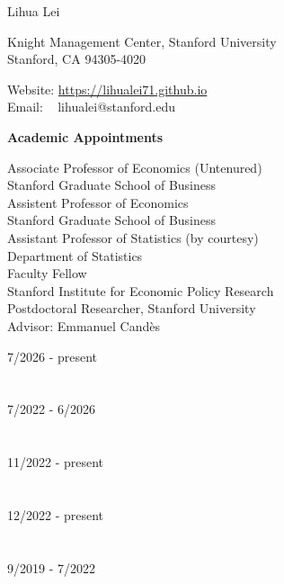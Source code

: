 \documentclass{article}
\begin{document}
\begin{Huge}
\noindent Lihua Lei
\end{Huge}

\vspace{5mm}
\begin{minipage}{0.6\linewidth}
  \flushleft
\noindent Knight Management Center, Stanford University \\
\noindent Stanford, CA 94305-4020
\end{minipage}
\hfill
\begin{minipage}{0.4\linewidth}
  Website: \url{https://lihualei71.github.io}\\
  Email: \,\,\,\,\,lihualei@stanford.edu
\end{minipage}

\vspace{5mm}
\begin{large}
\noindent \textbf{Academic Appointments}
\end{large}
\vspace{5mm}

\begin{minipage}{0.65\linewidth}
  \noindent Associate Professor of Economics (Untenured)\\
  Stanford Graduate School of Business\\

  \noindent Assistent Professor of Economics\\
  Stanford Graduate School of Business\\
  
  \noindent Assistant Professor of Statistics (by courtesy) \\
  Department of Statistics\\

  \noindent Faculty Fellow \\
  Stanford Institute for Economic Policy Research \\

  \noindent Postdoctoral Researcher, Stanford University\\
  Advisor: Emmanuel Cand\`{e}s
\end{minipage}\hfill
\begin{minipage}{0.34\linewidth}
\flushright
\vspace{-3mm}
7/2026 - present\\
~\\
~\\
7/2022 - 6/2026\\
~\\
~\\
11/2022 - present\\
~\\
~\\
12/2022 - present\\
~\\
~\\
9/2019 - 7/2022 \\
\end{minipage}
\end{document}

